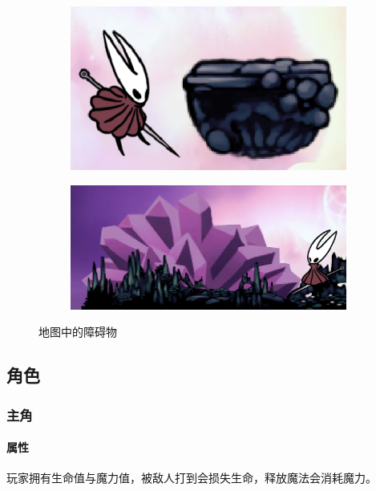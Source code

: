 \documentclass[12pt, twoside, a4paper]{article}
\begin{document}
\begin{figure}[h!]
    \centering
    \begin{subfigure}{0.45\textwidth}
        \includegraphics[width=\textwidth]{assets/report/tile0.png}
    \end{subfigure}
    \hspace{0.05\textwidth}
    \begin{subfigure}{0.45\textwidth}
        \includegraphics[width=\textwidth]{assets/report/tile1.png}
    \end{subfigure}
    \caption{地图中的障碍物}
\end{figure}

\subsection{角色}

\subsubsection{主角}

\paragraph{属性} 玩家拥有生命值与魔力值，被敌人打到会损失生命，释放魔法会消耗魔力。
\end{document}
